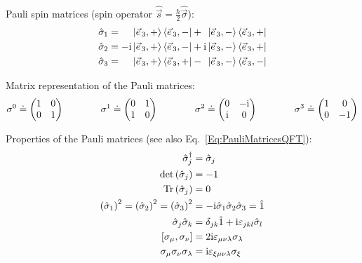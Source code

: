 			\noindent
			Pauli spin matrices (spin operator $\hat{\vec{s}} = \frac{\hbar}{2} \hat{\vec{\sigma}}$):
			\begin{equation}
				\begin{aligned}
					\hat{\sigma}_1 &= \phantom{-\i}\Ket{\vec{e}_3,+} \Bra{\vec{e}_3,-} + \phantom{\i}\Ket{\vec{e}_3,-} \Bra{\vec{e}_3,+} \\
					\hat{\sigma}_2 &= -\i\Ket{\vec{e}_3,+} \Bra{\vec{e}_3,-} + \i\Ket{\vec{e}_3,-} \Bra{\vec{e}_3,+} \\
					\hat{\sigma}_3 &= \phantom{-\i}\Ket{\vec{e}_3,+} \Bra{\vec{e}_3,+} - \phantom{\i}\Ket{\vec{e}_3,-} \Bra{\vec{e}_3,-} \\
				\end{aligned}
			\end{equation}

			\noindent
			Matrix representation of the Pauli matrices:
			\begin{equation}
				\label{Eq:PauliMatricesQFT}
				\begin{aligned}
					\sigma^0 \doteq \mqty(
					1 & 0 \\
					0 & 1 \\
					) &&\hsp
					\sigma^1 \doteq \mqty(
					0 & 1 \\
					1 & 0 \\
					) &&\hsp
					\sigma^2 \doteq \mqty(
					0 & -\i \\
					\i & 0 \\
					) &&\hsp
					\sigma^3 \doteq \mqty(
					1 & 0 \\
					0 & -1 \\
					)
				\end{aligned}
			\end{equation}

			\noindent
			Properties of the Pauli matrices (see also Eq.~\ref{Eq:PauliMatricesQFT}):
			\begin{equation}
				\label{Eq:PauliMatrices}
				\begin{aligned}
					\hat{\sigma}_j^\dagger &= \hat{\sigma}_j \\
					\det\qty(\hat{\sigma}_j) &= -1 \\
					\tr\qty(\hat{\sigma}_j) &= 0 \\
					\qty(\hat{\sigma}_1)^2 = \qty(\hat{\sigma}_2)^2 = \qty(\hat{\sigma}_3)^2 &= -\i\hat{\sigma}_1\hat{\sigma}_2\hat{\sigma}_3 = \hat{1} \\
					\hat{\sigma}_j \hat{\sigma}_k &= \delta_{jk}\hat{1} + \i\levicivita{jkl}\hat{\sigma}_l \\
					\comm{\sigma_\mu}{\sigma_\nu} &= 2\i\levicivita{\mu\nu\lambda}\sigma_\lambda \\
					\sigma_\mu \sigma_\nu \sigma_\lambda &= \i\levicivita{\xi\mu\nu\lambda}\sigma_\xi \\
				\end{aligned}
			\end{equation}

